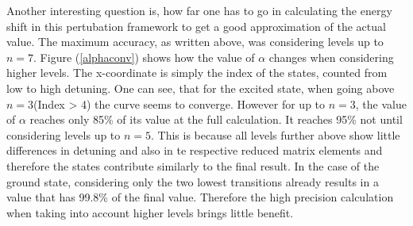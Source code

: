 Another interesting question is, how far one has to go in calculating the energy shift in this pertubation framework to get a good approximation of the actual value. The maximum accuracy, as written above, was considering levels up to $n=7$. Figure (\ref{alphaconv}) shows how the value of $\alpha$ changes when considering higher levels. The x-coordinate is simply the index of the states, counted from low to high detuning. One can see, that for the excited state, when going above $n=3$(Index > 4) the curve seems to converge. However for up to $n=3$, the value of $\alpha$ reaches only 85\% of its value at the full calculation. It reaches 95\% not until considering levels up to $n=5$. This is because all levels further above show little differences in detuning and also in te respective reduced matrix elements and therefore the states contribute similarly to the final result. In the case of the ground state, considering only the two lowest transitions already results in a value that has 99.8\% of the final value. Therefore the high precision calculation when taking into account higher levels brings little benefit.

